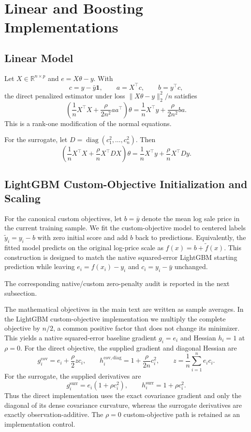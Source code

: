\documentclass[10pt]{article}
\theoremstyle{definition}
\newcommand{\R}{\mathbb{R}}
\newcommand{\diag}{\operatorname{diag}}
\newcommand{\1}{\mathbf{1}}
\begin{document}
\section{Linear and Boosting Implementations}
\label{app:implementation}


\subsection{Linear Model}

Let $X\in\R^{n\times p}$ and $e=X\theta-y$. With
\[
c=y-\bar y\1,\qquad a=X^\top c,\qquad b=y^\top c,
\]
the direct penalized estimator under loss $\|X\theta-y\|_2^2/n$ satisfies
\[
\left(
\frac{1}{n}X^\top X+\frac{\rho}{2n^2}aa^\top
\right)\theta
=
\frac{1}{n}X^\top y+\frac{\rho}{2n^2}ba.
\]
This is a rank-one modification of the normal equations.

For the surrogate, let $D=\diag(c_1^2,\ldots,c_n^2)$. Then
\[
\left(
\frac{1}{n}X^\top X+\frac{\rho}{n}X^\top DX
\right)\theta
=
\frac{1}{n}X^\top y+\frac{\rho}{n}X^\top Dy.
\]

\subsection{LightGBM Custom-Objective Initialization and Scaling}

For the canonical custom objectives, let $b=\bar y$ denote the mean log sale price
in the current training sample. We fit the custom-objective model to centered labels
$\widetilde y_i=y_i-b$ with zero initial score and add $b$ back to predictions.
Equivalently, the fitted model predicts on the original log-price scale as
$f(x)=b+\widetilde f(x)$.
This construction is designed to match the native squared-error LightGBM starting prediction while leaving $e_i=f(x_i)-y_i$ and $c_i=y_i-\bar y$ unchanged.

The corresponding native/custom zero-penalty audit is reported in the next subsection.

The mathematical objectives in the main text are written as sample averages. In
the LightGBM custom-objective implementation we multiply the complete objective by
$n/2$, a common positive factor that does not change its minimizer. This yields a
native squared-error baseline gradient $g_i=e_i$ and Hessian $h_i=1$ at $\rho=0$.
For the direct objective, the supplied gradient and diagonal Hessian are
\[
g_i^{\mathrm{cov}}
=
e_i+\frac{\rho}{2}z c_i,
\qquad
h_i^{\mathrm{cov,diag}}
=
1+\frac{\rho}{2n}c_i^2,
\qquad
z=\frac{1}{n}\sum_{i=1}^n e_i c_i.
\]
For the surrogate, the supplied derivatives are
\[
g_i^{\mathrm{surr}}=e_i(1+\rho c_i^2),
\qquad
h_i^{\mathrm{surr}}=1+\rho c_i^2.
\]
Thus the direct implementation uses the exact covariance gradient and only the
diagonal of its dense covariance curvature, whereas the surrogate derivatives are
exactly observation-additive. The $\rho=0$ custom-objective path is retained as an
implementation control.
\end{document}
